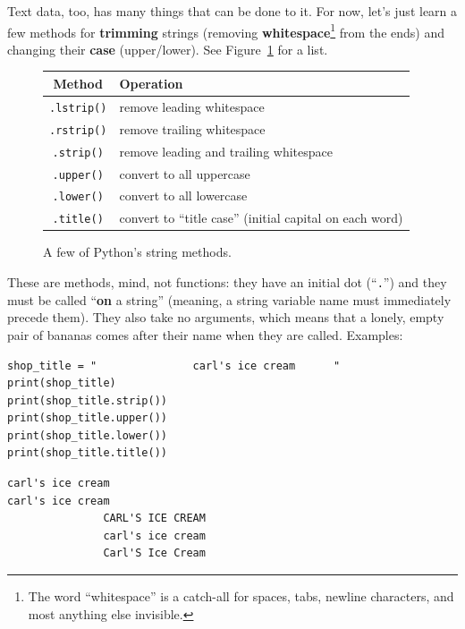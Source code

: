 Text data, too, has many things that can be done to it. For now, let's just
learn a few methods for \textbf{trimming} strings (removing
\textbf{whitespace}\footnote{The word ``whitespace'' is a catch-all for spaces,
tabs, newline characters, and most anything else invisible.} from the ends) and
changing their \textbf{case} (upper/lower). See Figure~\ref{fig:stringOps} for
a list.

\begin{figure}[ht]
\centering
\begin{tabular}{c | l}
\hline
Method & Operation \\
\hline
\texttt{.lstrip()} & remove leading whitespace \\
\texttt{.rstrip()} & remove trailing whitespace \\
\texttt{.strip()} & remove leading and trailing whitespace \\
\texttt{.upper()} & convert to all uppercase \\
\texttt{.lower()} & convert to all lowercase \\
\texttt{.title()} & convert to ``title case'' (initial capital on each word) \\
\hline
\end{tabular}
\smallskip
\caption{A few of Python's string methods.}
\label{fig:stringOps}
\end{figure}

These are methods, mind, not functions: they have an initial dot
(``\texttt{.}'') and they must be called ``\textbf{on} a string'' (meaning, a
string variable name must immediately precede them). They also take no
arguments, which means that a lonely, empty pair of bananas comes after their
name when they are called. Examples:

\begin{Verbatim}[fontsize=\small,samepage=true,frame=single,framesep=3mm]
shop_title = "               carl's ice cream      "
print(shop_title)
print(shop_title.strip())
print(shop_title.upper())
print(shop_title.lower())
print(shop_title.title())
\end{Verbatim}

\begin{Verbatim}[fontsize=\small,samepage=true,frame=leftline,framesep=5mm,framerule=1mm]
               carl's ice cream         
carl's ice cream
               CARL'S ICE CREAM         
               carl's ice cream         
               Carl'S Ice Cream         
\end{Verbatim}

